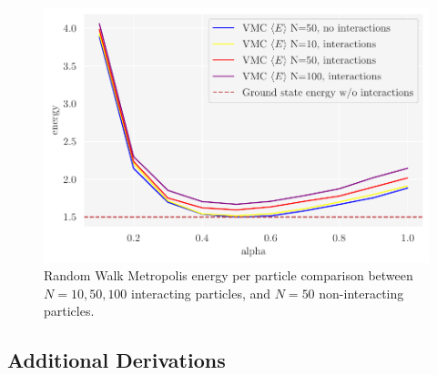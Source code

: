 \begin{figure}[H]
\begin{center}\includegraphics[scale=1.0]{latex/figures/grid_search_analytical_w_interactions_all_N.pdf}
\end{center}
\caption{Random Walk Metropolis energy per particle comparison between $N=10, 50, 100$ interacting particles, and $N=50$ non-interacting particles.}
\label{fig:comparisons_interactions_plot}
\end{figure}

\FloatBarrier

\subsection{Additional Derivations}\label{app:additional_derivations}

